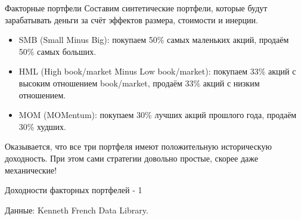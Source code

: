\documentclass{beamer}
\begin{document}
\begin{frame}{Факторные портфели}
\justify
Составим синтетические портфели, которые будут зарабатывать деньги за счёт эффектов размера, стоимости и инерции.

\begin{itemize}
\justifying
\item SMB (Small Minus Big): покупаем 50\% самых маленьких акций, продаём 50\% самых больших.
\item HML (High book/market Minus Low book/market): покупаем 33\% акций с высоким отношением book/market, продаём 33\% акций с низким отношением.
\item MOM (MOMentum): покупаем 30\% лучших акций прошлого года, продаём 30\% худших.
\end{itemize}
Оказывается, что все три портфеля имеют положительную историческую доходность. При этом сами стратегии довольно простые, скорее даже механические!
\end{frame}


    \newcommand{\addFactorPlot}[3]{
        \addplot[
            color=#2,
            mark=#3,
            line width=1pt,
            mark repeat=120,
            mark phase=36,
            mark options={scale=2}
        ]
        table [
            x = date,
            y = #1,
            col sep=comma
        ]
        {data/fama_french_cumulative_growth_data.csv};
    }
    
\begin{frame}{Доходности факторных портфелей - 1}
\centering
{\scriptsize Данные: Kenneth French Data Library.}
\end{frame}
\end{document}
